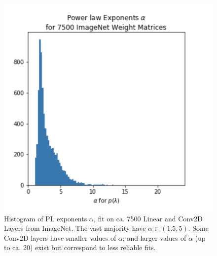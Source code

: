 \begin{figure}[t] %
   \centering
   \includegraphics[scale=0.40]{img/power-law-histogram.png} 
   \caption{Histogram of PL exponents $\alpha$, fit on ca. 7500 Linear and Conv2D Layers from ImageNet.  The vast majority have $\alpha\in(1.5,5)$.  Some Conv2D layers have smaller values of $\alpha$; and larger values of $\alpha$ (up to ca. 20) exist but correspond to less reliable fits.  }
   \label{fig:power-law-histogram}
\end{figure}



